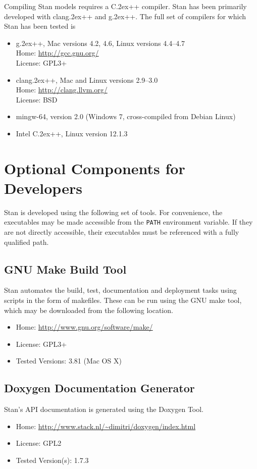 \documentclass[10pt]{report}
\newcommand{\Stan}{Stan\xspace}
\newcommand*{\Cpp}{C\raise.2ex\hbox{\footnotesize ++}\xspace} %
\newcommand{\clang}{{\ttfamily clang\raise.2ex\hbox{\footnotesize ++}}\xspace}
\newcommand{\gpp}{{\ttfamily g\raise.2ex\hbox{\footnotesize ++}}\xspace}
\newcommand{\code}[1]{{\tt #1}}
\begin{document}
Compiling \Stan models requires a \Cpp compiler.  \Stan has been
primarily developed with \clang and \gpp.  The full set of compilers
for which \Stan has been tested is
%
\begin{itemize}
%
\item \gpp, Mac versions 4.2, 4.6, Linux versions 4.4--4.7
\\
Home: \url{http://gcc.gnu.org/}
\\
License: GPL3+
%
\item \clang, Mac and Linux versions 2.9--3.0
\\
Home: \url{http://clang.llvm.org/}
\\
License: BSD
%
\item mingw-64, version 2.0 (Windows 7, cross-compiled from Debian Linux)
%
\item Intel \Cpp, Linux version 12.1.3
%
\end{itemize}
%

\section{Optional Components for Developers}

\Stan is developed using the following set of tools.  For convenience,
the executables may be made accessible from the \code{PATH}
environment variable.  If they are not directly accessible, their
executables must be referenced with a fully qualified path.


\subsection{GNU Make Build Tool}

\Stan automates the build, test, documentation and deployment tasks
using scripts in the form of makefiles.  These can be run using the
GNU make tool, which may be downloaded from the following
location.
\begin{itemize}
\item Home: \url{http://www.gnu.org/software/make/}
\item License: GPL3+
\item Tested Versions: 3.81 (Mac OS X)
\end{itemize}
%


\subsection{Doxygen Documentation Generator}

\Stan's API documentation is generated using the Doxygen Tool.
%
\begin{itemize}
\item Home: \url{http://www.stack.nl/~dimitri/doxygen/index.html}
\item License: GPL2
\item Tested Version(s): 1.7.3
\end{itemize}
\end{document}
